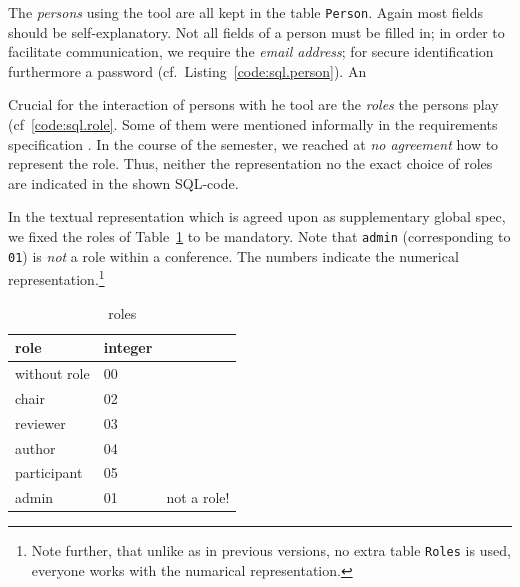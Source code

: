 \medskip{}



The \emph{persons} using the tool are all kept in the table
\texttt{Person}. Again most fields should be self-explanatory. Not all
fields of a person must be filled in; in order to facilitate communication,
we require the \emph{email address}; for secure identification furthermore
a password (cf.\ Listing~\ref{code:sql.person}).  An

%

\medskip{}

Crucial for the interaction of persons with he tool are the \emph{roles}
the persons play (cf~\ref{code:sql.role}. Some of them were mentioned
informally in the requirements specification \cite{coma:requirements}. In
the course of the semester, we reached at \emph{no agreement} how to
represent the role. Thus, neither the representation no the exact choice of
roles are indicated in the shown SQL-code.

%


In the textual representation which is agreed upon as supplementary global
spec, we fixed the roles of Table~\ref{tab:roles} to be mandatory. Note
that \texttt{admin} (corresponding to \texttt{01}) is \emph{not} a role
within a conference. The numbers indicate the numerical
representation.\footnote{Note further, that unlike as in previous versions,
  no extra table \texttt{Roles} is used, everyone works with the numarical
  representation.} 

\begin{table}[htbp]
  \centering
  \begin{tabular}{lll}
    \\
    role & integer
    \\\hline
    without role & 00 
    \\
    chair & 02
    \\
    reviewer & 03
    \\
    author & 04
    \\
    participant & 05
    \\\hline
    admin & 01 & not a role!
  \end{tabular}
  \caption{roles}
  \label{tab:roles}
\end{table}


\medskip%

